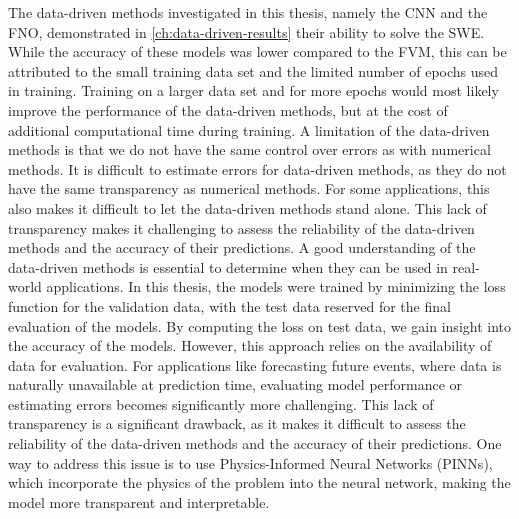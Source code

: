 The data-driven methods investigated in this thesis, namely the CNN and the FNO, demonstrated in \autoref{ch:data-driven-results} their ability to solve the SWE.
While the accuracy of these models was lower compared to the FVM, this can be attributed to the small training data set and the limited number of epochs used in training.
Training on a larger data set and for more epochs would most likely improve the performance of the data-driven methods, but at the cost of additional computational time during training.
A limitation of the data-driven methods is that we do not have the same control over errors as with numerical methods.
It is difficult to estimate errors for data-driven methods, as they do not have the same transparency as numerical methods.
For some applications, this also makes it difficult to let the data-driven methods stand alone.
This lack of transparency makes it challenging to assess the reliability of the data-driven methods and the accuracy of their predictions.
A good understanding of the data-driven methods is essential to determine when they can be used in real-world applications.
In this thesis, the models were trained by minimizing the loss function for the validation data, with the test data reserved for the final evaluation of the models.
By computing the loss on test data, we gain insight into the accuracy of the models.
However, this approach relies on the availability of data for evaluation.
For applications like forecasting future events, where data is naturally unavailable at prediction time, evaluating model performance or estimating errors becomes significantly more challenging.
This lack of transparency is a significant drawback, as it makes it difficult to assess the reliability of the data-driven methods and the accuracy of their predictions.
One way to address this issue is to use Physics-Informed Neural Networks (PINNs), which incorporate the physics of the problem into the neural network, making the model more transparent and interpretable.


